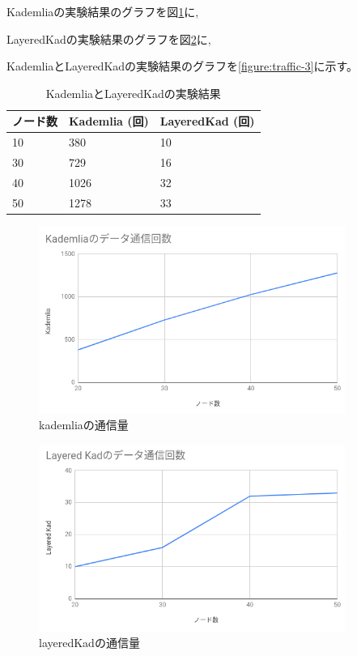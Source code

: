 \documentclass[sotsuron]{jcsie}
\begin{document}
Kademliaの実験結果のグラフを図\ref{figure:traffic-1}に,

LayeredKadの実験結果のグラフを図\ref{figure:traffic-2}に,

KademliaとLayeredKadの実験結果のグラフを\ref{figure:traffic-3}に示す。

\begin{table}[H]
	\caption{KademliaとLayeredKadの実験結果}
	\centering
	\label{table:traffic-result}
	\begin{tabular}{|l|l|l|}
		\hline
		ノード数     &
		Kademlia (回) &
		LayeredKad (回)\\
		\hline
		10               &
		380               &
		10\\
		\hline
		30               &
		729               &
		16\\
		\hline
		40               &
		1026               &
		32\\
		\hline
		50               &
		1278               &
		33\\
		\hline
	\end{tabular}
\end{table}

\begin{figure}[H]
	\centering
	\includegraphics[width=10cm]{./assets/image/kad_traffic.png}
	\caption{kademliaの通信量}
	\label{figure:traffic-1}
\end{figure}

\begin{figure}[H]
	\centering
	\includegraphics[width=10cm]{./assets/image/layered-kad_traffic.png}
	\caption{layeredKadの通信量}
	\label{figure:traffic-2}
\end{figure}
\end{document}
